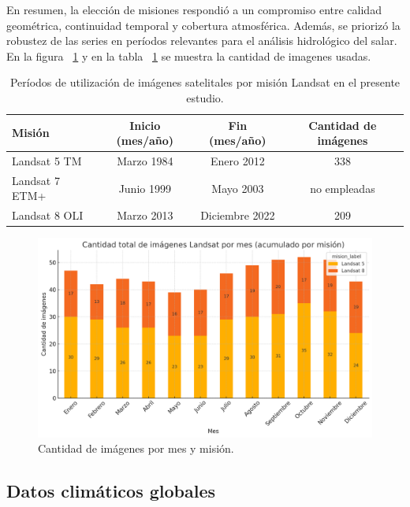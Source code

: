 En resumen, la elección de misiones respondió a un compromiso entre calidad geométrica, continuidad temporal y cobertura atmosférica. Además,  se priorizó la robustez de las series en períodos relevantes para el análisis hidrológico del salar. En la figura ~\ref{fig:cant_imagenes} y en la tabla ~\ref{tab:periodos_landsat} se muestra la cantidad de imagenes usadas. 


\begin{table}[h]
	\centering
	\caption[Períodos Landsat]{Períodos de utilización de imágenes satelitales por misión Landsat en el presente estudio.}
	\begin{tabular}{l c c c}    
		\toprule
		\textbf{Misión}     & \textbf{Inicio (mes/año)} & \textbf{Fin (mes/año)} & \textbf{Cantidad de imágenes} \\
		\midrule
		Landsat 5 TM        & Marzo 1984   & Enero 2012        & 338 \\		
		Landsat 7 ETM+      & Junio 1999   & Mayo 2003         & no empleadas \\
		Landsat 8 OLI       & Marzo 2013   & Diciembre 2022    & 209 \\
		\bottomrule
	\end{tabular}
        \hline
	\label{tab:periodos_landsat}
\end{table}

\begin{figure}[ht]
        \centering
        \includegraphics[scale=.4]
        {Figures/fig12.png}
        \caption{Cantidad de imágenes por mes y misión.}
        \label{fig:cant_imagenes}
\end{figure}

\subsection{Datos climáticos globales}

